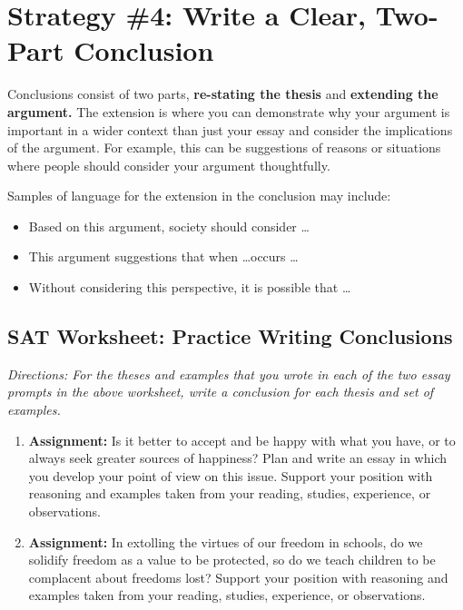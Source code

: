 \section{Strategy \#4: Write a Clear, Two-Part Conclusion}

Conclusions consist of two parts, \textbf{re-stating the thesis} and \textbf{extending the argument.} The extension
is where you can demonstrate why your argument is important in a wider context than just your essay and consider the implications of the argument. For example, this can be suggestions of reasons or situations where people should consider your argument thoughtfully.

\bigskip
Samples of language for the extension in the conclusion may include:

\begin{itemize}
\item Based on this argument, society should consider \ldots
\item This argument suggestions that when \ldots occurs \ldots
\item Without considering this perspective, it is possible that \ldots
\end{itemize}


\subsection{SAT Worksheet: Practice Writing Conclusions}
\textit{Directions: For the theses and examples that you wrote in each of the two essay prompts in the
above worksheet, write a conclusion for each thesis and set of examples.}

\begin{enumerate}
\item  \large{\bf{Assignment:}} Is it better to accept and be happy with what you have, or to always seek greater sources of happiness? Plan and write an essay in which you develop your point of view on this issue. Support your position with reasoning and examples taken from your reading, studies, experience, or observations.

\vfill

\item \large{\bf{Assignment:}} In extolling the virtues of our freedom in schools, do we solidify freedom as a value to be protected, so do we teach children to be complacent about freedoms lost? Support your position with reasoning and examples taken from your reading, studies, experience, or observations.

\vfill

\end{enumerate}

